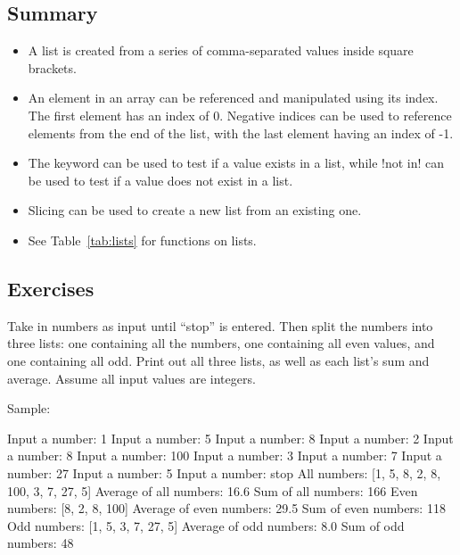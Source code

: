 \documentclass[11pt]{cselabheader}
\begin{document}
\subsection{Summary}

\begin{itemize}
  \item A list is created from a series of comma-separated values inside square
    brackets.  
  \item An element in an array can be referenced and manipulated
    using its index. The first element has an index of 0. Negative indices can
    be used to reference elements from the end of the list, with the last
    element having an index of -1.
  \item The  keyword can be used to test if a value exists in a
    list, while \pythoninline!not in! can be used to test if a value does not exist
    in a list.
  \item Slicing can be used to create a new list from an existing one.
  \item See Table~\ref{tab:lists} for functions on lists.
\end{itemize}

\subsection{Exercises}
\label{subsec:listsex}

\begin{ex}[parity.py] Take in numbers as input until ``stop'' is entered. Then
  split the numbers into three lists: one containing all the numbers, one
  containing all even values, and one containing all odd. Print out all three
  lists, as well as each list's sum and average. Assume all input values are
  integers.

  Sample:

\begin{verbatimcode}
Input a number: 1
Input a number: 5
Input a number: 8
Input a number: 2
Input a number: 8
Input a number: 100
Input a number: 3
Input a number: 7
Input a number: 27
Input a number: 5
Input a number: stop
All numbers: [1, 5, 8, 2, 8, 100, 3, 7, 27, 5]
Average of all numbers: 16.6
Sum of all numbers: 166
Even numbers: [8, 2, 8, 100]
Average of even numbers: 29.5
Sum of even numbers: 118
Odd numbers: [1, 5, 3, 7, 27, 5]
Average of odd numbers: 8.0
Sum of odd numbers: 48
\end{verbatimcode}

\end{ex}
\end{document}
